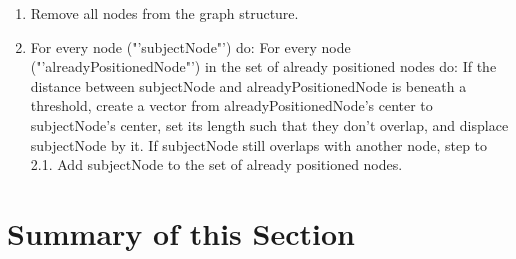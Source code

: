 \begin{enumerate}
\item Remove all nodes from the graph structure.	
\item For every node ("'subjectNode"') do:
	\subitem For every node ("'alreadyPositionedNode"') in the set of already positioned nodes do:
	\subsubitem If the distance between subjectNode and alreadyPositionedNode is beneath a
	threshold, create a vector from alreadyPositionedNode's center to subjectNode's center, set
	its length such that they don't overlap, and displace subjectNode by it.
	\subsubitem If subjectNode still overlaps with another node, step to 2.1.
	\subsubitem Add subjectNode to the set of already positioned nodes.
\end{enumerate}

\section{Summary of this Section}